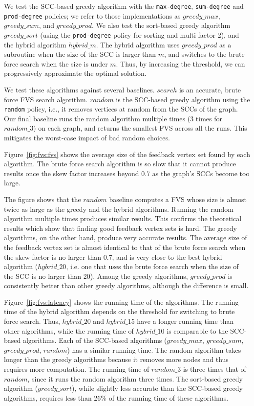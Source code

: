 We test the SCC-based greedy algorithm with the \texttt{max-degree}, \texttt{sum-degree} and \texttt{prod-degree} policies; we refer to those implementations as $greedy\_max$, $greedy\_sum$, and $greedy\_prod$. We also test the sort-based greedy algorithm $greedy\_sort$ (using the \texttt{prod-degree} policy for sorting and multi factor 2), and the hybrid algorithm $hybrid\_m$. The hybrid algorithm uses $greedy\_prod$ as a subroutine when the size of the SCC is larger than $m$, and switches to the brute force search when the size is under $m$. Thus, by increasing the threshold, we can progressively approximate the optimal solution. 


We test these algorithms against several baselines. $search$ is an accurate, brute force FVS search algorithm. $random$ is the SCC-based greedy algorithm using the \texttt{random} policy, i.e., it removes vertices at random from the SCCs of the graph. Our final baseline runs the random algorithm multiple times (3 times for $random\_3$) on each graph, and returns the smallest FVS across all the runs. This mitigates the worst-case impact of bad random choices.



Figure~\ref{fig:fvs:fvs} shows the average size of the feedback vertex set found by each algorithm. The brute force search algorithm is so slow that it cannot produce results once the skew factor increases beyond $0.7$ as the graph's SCCs become too large.


The figure shows that the $random$ baseline computes a FVS whose size is almost twice as large as the greedy and the hybrid algorithms. Running the random algorithm multiple times produces similar results. This confirms the theoretical results which show that finding good feedback vertex sets is hard. The greedy algorithms, on the other hand, produce very accurate results. The average size of the feedback vertex set is almost identical to that of the brute force search when the skew factor is no larger than $0.7$, and is very close to the best hybrid algorithm ($hybrid\_20$, i.e. one that uses the brute force search when the size of the SCC is no larger than 20). Among the greedy algorithms, $greedy\_prod$ is consistently better than other greedy algorithms, although the difference is small.

Figure~\ref{fig:fvs:latency} shows the running time of the algorithms. The running time of the hybrid algorithm depends on the threshold for switching to brute force search. Thus, $hybrid\_20$ and $hybrid\_15$ have a longer running time than other algorithms, while the running time of $hybrid\_10$ is comparable to the SCC-based algorithms. Each of the SCC-based algorithms ($greedy\_max$, $greedy\_sum$, $greedy\_prod$, $random$) has a similar running time. The random algorithm takes longer than the greedy algorithms because it removes more nodes and thus requires more computation. The running time of $random\_3$ is three times that of $random$, since it runs the random algorithm three times. The sort-based greedy algorithm ($greedy\_sort$), while slightly less accurate than the SCC-based greedy algorithms, requires less than 26\% of the running time of these algorithms. 

